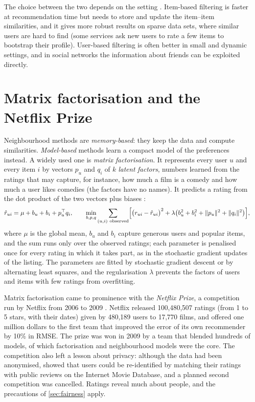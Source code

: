 The choice between the two depends on the setting \citep{segaran2007programming}. Item-based filtering is faster at
recommendation time but needs to store and update the item--item similarities, and it gives more robust results on sparse
data sets, where similar users are hard to find (some services ask new users to rate a few items to bootstrap their
profile). User-based filtering is often better in small and dynamic settings, and in social networks the information about
friends can be exploited directly.

\section{Matrix factorisation and the Netflix Prize\extsec}\label{sec:mf}

Neighbourhood methods are \emph{memory-based}: they keep the data and compute similarities. \emph{Model-based} methods
learn a compact model of the preferences instead. A widely used one is \emph{matrix factorisation}. It represents
every user $u$ and every item $i$ by vectors $p_u$ and $q_i$ of $k$ \emph{latent factors}, numbers learned from the ratings that may capture, for instance, how much a film is a comedy and how much a user likes comedies (the factors have no names). It predicts a rating from the dot
product of the two vectors plus biases \citep{koren2009matrix}:
\begin{equation}\label{eq:mf}
  \hat r_{ui}=\mu+b_u+b_i+p_u^\top q_i,\qquad
  \min_{b,p,q}\sum_{(u,i)\ \text{observed}}\Bigl[\bigl(r_{ui}-\hat r_{ui}\bigr)^2
  +\lambda\bigl(b_u^2+b_i^2+\|p_u\|^2+\|q_i\|^2\bigr)\Bigr],
\end{equation}
where $\mu$ is the global mean, $b_u$ and $b_i$ capture generous users and popular items, and the sum runs only over the
observed ratings; each parameter is penalised once for every rating in which it takes part, as in the
stochastic gradient updates of the listing. The parameters are fitted by stochastic gradient descent or by alternating least squares, and the
regularisation $\lambda$ prevents the factors of users and items with few ratings from overfitting.

Matrix factorisation came to prominence with the \emph{Netflix Prize}, a competition run by Netflix from 2006 to 2009
\citep{bennett2007netflix}. Netflix released 100,480,507 ratings (from 1 to 5 stars, with their dates) given by 480,189
users to 17,770 films, and offered one million dollars to the first team that improved the error of its own recommender
by 10\% in RMSE. The prize was won in 2009 by a team that blended hundreds of models, of which factorisation and neighbourhood
models were the core. The competition also left a lesson about privacy: although the data had been anonymised,
\citet{narayanan2008robust} showed that users could be re-identified by matching their ratings with public reviews on the Internet Movie
Database, and a planned second competition was cancelled. Ratings reveal much about people,
and the precautions of \cref{sec:fairness} apply.


